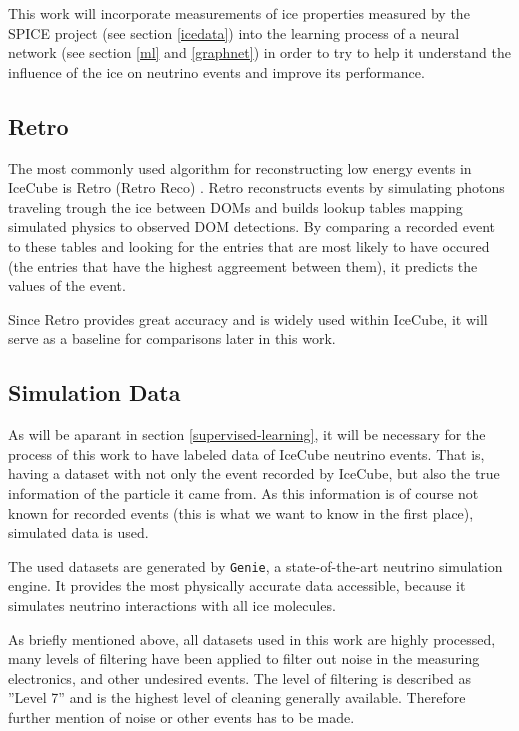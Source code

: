 \documentclass[a4paper,10pt]{scrartcl}
\begin{document}
This work will incorporate measurements of ice properties measured by the SPICE project (see section \ref{icedata}) \cite{1301.5361} into the learning process of a neural network (see section \ref{ml} and \ref{graphnet}) in order to try to help it understand the influence of the ice on neutrino events and improve its performance.

\subsection{Retro}

The most commonly used algorithm for reconstructing low energy events in IceCube is Retro (Retro Reco) \cite{retro}.
Retro reconstructs events by simulating photons traveling trough the ice between DOMs and builds lookup tables mapping simulated physics to observed DOM detections.
By comparing a recorded event to these tables and looking for the entries that are most likely to have occured (the entries that have the highest aggreement between them), it predicts the values of the event.

Since Retro provides great accuracy and is widely used within IceCube, it will serve as a baseline for comparisons later in this work.

\subsection{Simulation Data}

As will be aparant in section \ref{supervised-learning}, it will be necessary for the process of this work to have labeled data of IceCube neutrino events.
That is, having a dataset with not only the event recorded by IceCube, but also the true information of the particle it came from.
As this information is of course not known for recorded events (this is what we want to know in the first place), simulated data is used.

The used datasets are generated by \texttt{Genie}, a state-of-the-art neutrino simulation engine.
It provides the most physically accurate data accessible, because it simulates neutrino interactions with all ice molecules.

As briefly mentioned above, all datasets used in this work are highly processed, many levels of filtering have been applied to filter out noise in the measuring electronics, and other undesired events.
The level of filtering is described as ''Level 7'' \cite{rasmus-master} and is the highest level of cleaning generally available.
Therefore further mention of noise or other events has to be made.
\end{document}
